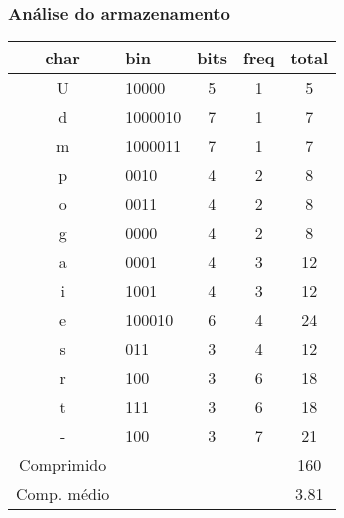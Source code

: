 \documentclass[10pt]{beamer}
\begin{document}
\begin{frame}[t]
    \frametitle{Análise do armazenamento}
    \begin{center}
        \begin{tabular}{clccc}
            char        & bin     & bits & freq & total \\
            \hline
            \pause U           &  10000   & 5    & 1    & 5     \\
            \pause d           & 1000010 & 7    & 1    & 7     \\
            \pause m           & 1000011 & 7    & 1    & 7     \\
            \pause p           & 0010    & 4    & 2    & 8     \\
            \pause o           & 0011    & 4    & 2    & 8     \\
            \pause g           & 0000    & 4    & 2    & 8     \\
            \pause a           & 0001    & 4    & 3    & 12    \\
            \pause i           & 1001    & 4    & 3    & 12    \\
            \pause e           & 100010  & 6    & 4    & 24    \\
            \pause s           & 011     & 3    & 4    & 12    \\
            \pause r           & 100     & 3    & 6    & 18    \\
            \pause t           & 111     & 3    & 6    & 18    \\
            \pause -           & 100     & 3    & 7    & 21    \\
            \hline
            \pause Comprimido  &         &      &      & 160   \\
            \pause Comp. médio &         &      &      & 3.81  \\
        \end{tabular}
    \end{center}

\end{frame}
\end{document}
